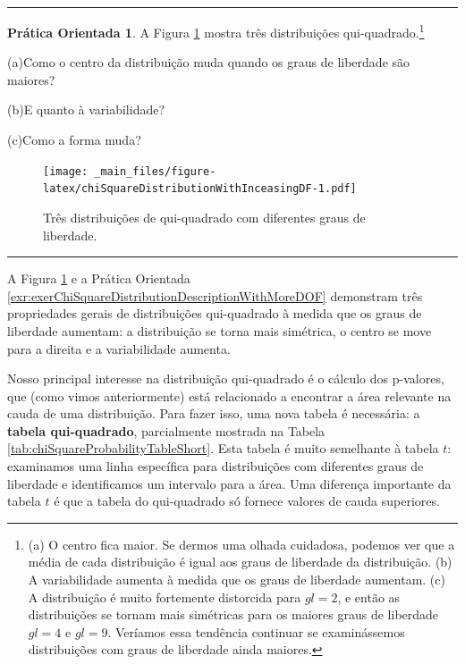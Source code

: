 \documentclass[
]{book}
\theoremstyle{definition}
\theoremstyle{definition}
\theoremstyle{definition}
\newtheorem{exercise}{Prática Orientada}[chapter]
\theoremstyle{definition}
\theoremstyle{remark}
\begin{document}
\begin{center}\rule{0.5\linewidth}{0.5pt}\end{center}

\begin{exercise}
\protect\hypertarget{exr:exerChiSquareDistributionDescriptionWithMoreDOF}{}{\label{exr:exerChiSquareDistributionDescriptionWithMoreDOF} }A Figura \ref{fig:chiSquareDistributionWithInceasingDF} mostra três distribuições qui-quadrado.\footnote{(a) O centro fica maior. Se dermos uma olhada cuidadosa, podemos ver que a média de cada distribuição é igual aos graus de liberdade da distribuição. (b) A variabilidade aumenta à medida que os graus de liberdade aumentam. (c) A distribuição é muito fortemente distorcida para \(gl = 2\), e então as distribuições se tornam mais simétricas para os maiores graus de liberdade \(gl = 4\) e \(gl = 9\). Veríamos essa tendência continuar se examinássemos distribuições com graus de liberdade ainda maiores.}

(a)Como o centro da distribuição muda quando os graus de liberdade são maiores?

(b)E quanto à variabilidade?

(c)Como a forma muda?
\end{exercise}

\begin{figure}
\centering
\texttt{[image: \_main\_files/figure-latex/chiSquareDistributionWithInceasingDF-1.pdf]}
\caption{\label{fig:chiSquareDistributionWithInceasingDF}Três distribuições de qui-quadrado com diferentes graus de liberdade.}
\end{figure}

\begin{center}\rule{0.5\linewidth}{0.5pt}\end{center}

A Figura \ref{fig:chiSquareDistributionWithInceasingDF} e a Prática Orientada \ref{exr:exerChiSquareDistributionDescriptionWithMoreDOF} demonstram três propriedades gerais de distribuições qui-quadrado à medida que os graus de liberdade aumentam: a distribuição se torna mais simétrica, o centro se move para a direita e a variabilidade aumenta.

Nosso principal interesse na distribuição qui-quadrado é o cálculo dos p-valores, que (como vimos anteriormente) está relacionado a encontrar a área relevante na cauda de uma distribuição. Para fazer isso, uma nova tabela é necessária: a \textbf{tabela qui-quadrado}, parcialmente mostrada na Tabela \ref{tab:chiSquareProbabilityTableShort}. Esta tabela é muito semelhante à tabela \(t\): examinamos uma linha específica para distribuições com diferentes graus de liberdade e identificamos um intervalo para a área. Uma diferença importante da tabela \(t\) é que a tabela do qui-quadrado só fornece valores de cauda superiores.
\end{document}
